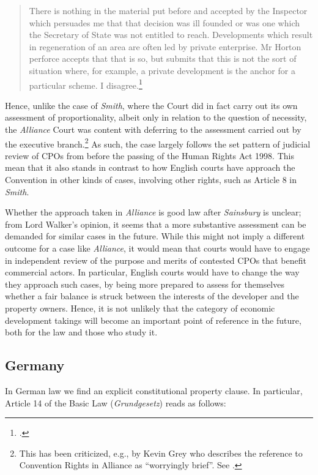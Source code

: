 \begin{quote}
There is nothing in the material put before and accepted by the Inspector which persuades me that that decision was ill founded or was one which the Secretary of State was not entitled to reach. Developments which result in regeneration of an area are often led by private enterprise. Mr Horton perforce accepts that that is so, but submits that this is not the sort of situation where, for example, a private development is the anchor for a particular scheme. I disagree.\footcite[19]{alliance06}
\end{quote}

Hence, unlike the case of {\it Smith}, where the Court did in fact carry out its own assessment of proportionality, albeit only in relation to the question of necessity, the {\it Alliance} Court was content with deferring to the assessment carried out by the executive branch.\footnote{This has been criticized, e.g., by Kevin Grey who describes the reference to Convention Rights in Alliance as ``worryingly brief''. See \cite{gray11}.} As such, the case largely follows the set pattern of judicial review of CPOs from before the passing of the Human Rights Act 1998. This mean that it also stands in contrast to how English courts have approach the Convention in other kinds of cases, involving other rights, such as Article 8 in {\it Smith}. 

Whether the approach taken in {\it Alliance} is good law after {\it Sainsbury} is unclear; from Lord Walker's opinion, it seems that a more substantive assessment can be demanded for similar cases in the future. While this might not imply a different outcome for a case like {\it Alliance}, it would mean that courts would have to engage in independent review of the purpose and merits of contested CPOs that benefit commercial actors. In particular, English courts would have to change the way they approach such cases, by being more prepared to assess for themselves whether a fair balance is struck between the interests of the developer and the property owners. Hence, it is not unlikely that the category of economic development takings will become an important point of reference in the future, both for the law and those who study it.

\subsection{Germany}\label{sec:germany}

In German law we find an explicit constitutional property clause. In particular, Article 14 of the Basic Law ({\it Grundgesetz}) reads as follows:

